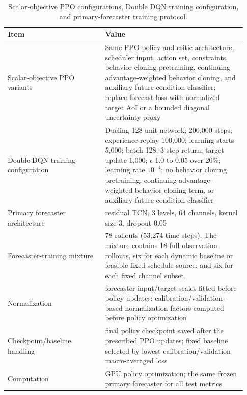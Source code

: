 \begin{table}[htbp]
  \centering
  \caption{Scalar-objective PPO configurations, Double DQN training configuration, and primary-forecaster
  training protocol.}
  \label{tab:control_protocol_hyperparameters}
  \scriptsize
  \renewcommand{\arraystretch}{0.86}
  \setlength{\tabcolsep}{3.2pt}
  \begin{tabular}{@{}p{0.38\linewidth}p{0.55\linewidth}@{}}
    \toprule
    Item & Value \\
    \midrule
    Scalar-objective PPO variants & Same PPO policy and critic architecture, scheduler input, action set, constraints, behavior cloning pretraining, continuing advantage-weighted behavior cloning, and auxiliary future-condition classifier; replace forecast loss with normalized target AoI or a bounded diagonal uncertainty proxy \\
    Double DQN training configuration & Dueling 128-unit network; 200,000 steps; experience replay 100,000; learning starts 5,000; batch 128; 3-step return; target update 1,000; $\epsilon$ 1.0 to 0.05 over 20\%; learning rate $10^{-4}$; no behavior cloning pretraining, continuing advantage-weighted behavior cloning term, or auxiliary future-condition classifier \\
    Primary forecaster architecture & residual TCN, 3 levels, 64 channels, kernel size 3, dropout 0.05 \\
    Forecaster-training mixture & 78 rollouts (53,274 time steps). The mixture contains 18 full-observation rollouts, six for each dynamic baseline or feasible fixed-schedule source, and six for each fixed channel subset. \\
    Normalization & forecaster input/target scales fitted before policy updates; calibration/validation-based normalization factors computed before policy optimization \\
    Checkpoint/baseline handling & final policy checkpoint saved after the prescribed PPO updates; fixed baseline selected by lowest calibration/validation macro-averaged loss \\
    Computation & GPU policy optimization; the same frozen primary forecaster for all test metrics \\
    \bottomrule
  \end{tabular}
\end{table}

